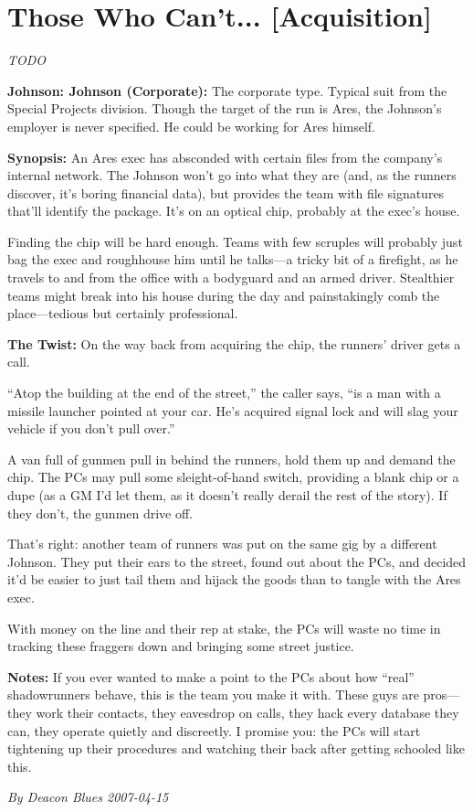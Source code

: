 \documentclass[letterpaper,twocolumn,10.5pt]{article}
\newenvironment{scenario}[6]
	{
		\section{#1 {\small[#2]}}
		\textit{#3}
		\def\TMPSCENARIO{#4 #5}
	}
	{\small\textit{By \TMPSCENARIO}}
\newcommand{\johnson}[2]{\textbf{Johnson: #1 (#2):}}
\newcommand{\synopsis}{\textbf{Synopsis: }}
\newcommand{\notes}{\textbf{Notes: }}
\newcommand{\twist}{\textbf{The Twist: }}
\begin{document}
\begin{scenario}{Those Who Can't...}
	{Acquisition}
	{TODO}
	{Deacon Blues}
	{2007-04-15}
	{https://forum.rpg.net/showthread.php?321504-Shadowrun-4th-101-Instant-Scenarios\&p=7173863#post7173863}

\johnson{Johnson}{Corporate} The corporate type. Typical suit from the Special Projects division. Though the target of the run is Ares, the Johnson's employer is never specified. He could be working for Ares himself.

\synopsis An Ares exec has absconded with certain files from the company's internal network. The Johnson won't go into what they are (and, as the runners discover, it's boring financial data), but provides the team with file signatures that'll identify the package. It's on an optical chip, probably at the exec's house.

Finding the chip will be hard enough. Teams with few scruples will probably just bag the exec and roughhouse him until he talks---a tricky bit of a firefight, as he travels to and from the office with a bodyguard and an armed driver. Stealthier teams might break into his house during the day and painstakingly comb the place---tedious but certainly professional.

\twist On the way back from acquiring the chip, the runners' driver gets a call.

``Atop the building at the end of the street,'' the caller says, ``is a man with a missile launcher pointed at your car. He's acquired signal lock and will slag your vehicle if you don't pull over.''

A van full of gunmen pull in behind the runners, hold them up and demand the chip. The PCs may pull some sleight-of-hand switch, providing a blank chip or a dupe (as a GM I'd let them, as it doesn't really derail the rest of the story). If they don't, the gunmen drive off.

That's right: another team of runners was put on the same gig by a different Johnson. They put their ears to the street, found out about the PCs, and decided it'd be easier to just tail them and hijack the goods than to tangle with the Ares exec.

With money on the line and their rep at stake, the PCs will waste no time in tracking these fraggers down and bringing some street justice.

\notes  If you ever wanted to make a point to the PCs about how ``real'' shadowrunners behave, this is the team you make it with. These guys are pros---they work their contacts, they eavesdrop on calls, they hack every database they can, they operate quietly and discreetly. I promise you: the PCs will start tightening up their procedures and watching their back after getting schooled like this. 

\end{scenario}
\end{document}
